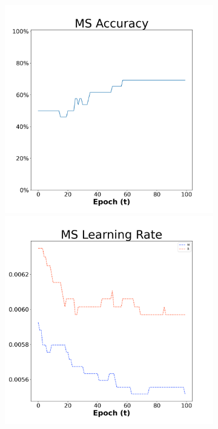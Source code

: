 \begin{figure}[H]
    \centering %
\begin{subfigure}{0.3\textwidth}
  \includegraphics[width=\linewidth]{images/exper1/Sonar/MS_0.01_acc.png}
    \includegraphics[width=\linewidth]{images/exper1/Sonar/MS_0.01_lr.png}

\end{subfigure}
\end{figure}
